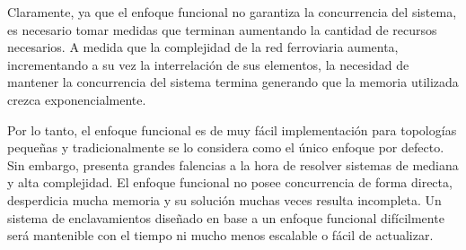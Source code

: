     Claramente, ya que el enfoque funcional no garantiza la concurrencia del sistema, es necesario tomar medidas que terminan aumentando la cantidad de recursos necesarios. A medida que la complejidad de la red ferroviaria aumenta, incrementando a su vez la interrelación de sus elementos, la necesidad de mantener la concurrencia del sistema termina generando que la memoria utilizada crezca exponencialmente.

    Por lo tanto, el enfoque funcional es de muy fácil implementación para topologías pequeñas y tradicionalmente se lo considera como el único enfoque por defecto. Sin embargo, presenta grandes falencias a la hora de resolver sistemas de mediana y alta complejidad. El enfoque funcional no posee concurrencia de forma directa, desperdicia mucha memoria y su solución muchas veces resulta incompleta. Un sistema de enclavamientos diseñado en base a un enfoque funcional difícilmente será mantenible con el tiempo ni mucho menos escalable o fácil de actualizar.